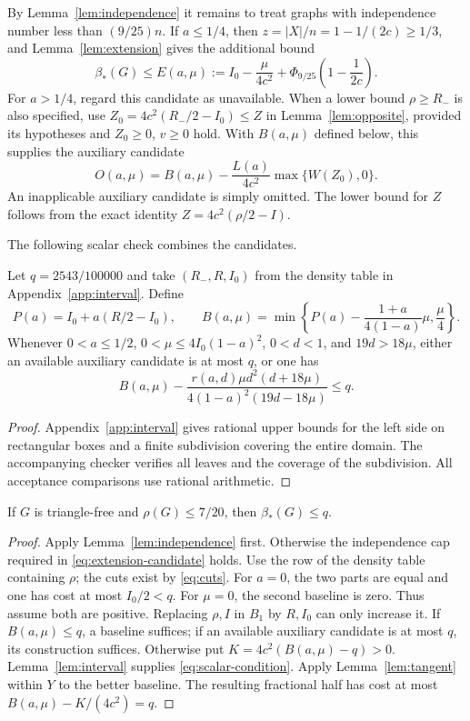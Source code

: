 \documentclass[12pt]{article}
\newcommand{\B}{\beta_*}
\begin{document}
By Lemma~\ref{lem:independence} it remains to treat graphs with
independence number less than $(9/25)n$. If $a\le1/4$, then
$z=|X|/n=1-1/(2c)\ge1/3$, and Lemma~\ref{lem:extension} gives
the additional bound
\begin{equation}\label{eq:extension-candidate}
 \B(G)\le E(a,\mu):=I_0-\frac{\mu}{4c^2}
      +\Phi_{9/25}\left(1-\frac1{2c}\right).
\end{equation}
For $a>1/4$, regard this candidate as unavailable.
When a lower bound $\rho\ge R_-$ is also specified, use
$Z_0=4c^2(R_-/2-I_0)\le Z$ in Lemma~\ref{lem:opposite}, provided
its hypotheses and $Z_0\ge0$, $v\ge0$ hold. With $B(a,\mu)$ defined
below, this supplies the auxiliary candidate
\[
 O(a,\mu)=B(a,\mu)-\frac{L(a)}{4c^2}\max\{W(Z_0),0\}.
\]
An inapplicable auxiliary candidate is simply omitted.
The lower bound for $Z$ follows from the exact identity
$Z=4c^2(\rho/2-I)$.

The following scalar check combines the candidates.
\begin{lemma}\label{lem:interval}
Let $q=2543/100000$ and take $(R_-,R,I_0)$ from the density table
in Appendix~\ref{app:interval}. Define
\[
 P(a)=I_0+a(R/2-I_0),\qquad
 B(a,\mu)=\min\left\{P(a)-\frac{1+a}{4(1-a)}\mu,\frac\mu4\right\}.
\]
Whenever $0<a\le1/2$, $0<\mu\le4I_0(1-a)^2$, $0<d<1$, and
$19d>18\mu$, either an available auxiliary candidate is at most
$q$, or one has
\begin{equation}\label{eq:interval}
 B(a,\mu)-
 \frac{r(a,d)\mu d^2(d+18\mu)}{4(1-a)^2(19d-18\mu)}\le q.
\end{equation}
\end{lemma}
\begin{proof}
Appendix~\ref{app:interval} gives rational upper bounds for the left side
on rectangular boxes and a finite subdivision covering the entire domain.
The accompanying checker verifies all leaves and the coverage of the
subdivision. All acceptance comparisons use rational arithmetic.
\end{proof}

\begin{proposition}\label{prop:low}
If $G$ is triangle-free and $\rho(G)\le7/20$, then $\B(G)\le q$.
\end{proposition}
\begin{proof}
Apply Lemma~\ref{lem:independence} first. Otherwise the independence
cap required in \eqref{eq:extension-candidate} holds. Use the row of
the density table containing $\rho$; the cuts exist by \eqref{eq:cuts}.
For $a=0$, the two parts are equal and one has cost at most $I_0/2<q$.
For $\mu=0$, the second baseline is zero. Thus assume both are positive.
Replacing $\rho,I$ in $B_1$ by $R,I_0$ can only increase it.
If $B(a,\mu)\le q$, a baseline suffices; if an available auxiliary
candidate is at most $q$, its construction suffices. Otherwise put
$K=4c^2(B(a,\mu)-q)>0$. Lemma~\ref{lem:interval} supplies
\eqref{eq:scalar-condition}. Apply Lemma~\ref{lem:tangent} within $Y$
to the better baseline. The resulting fractional half has cost at most
$B(a,\mu)-K/(4c^2)=q$.
\end{proof}
\end{document}
